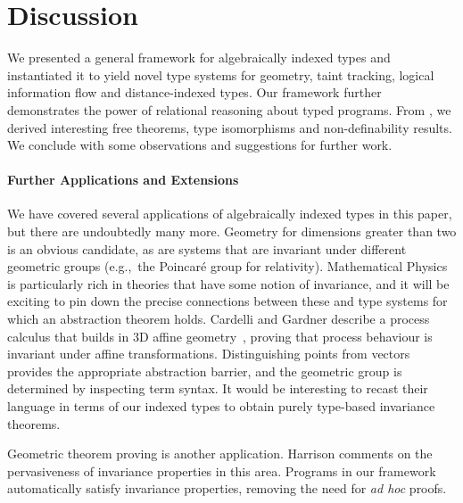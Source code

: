 \section{Discussion}
\label{sec:discussion}

We presented a general framework for algebraically indexed types
and instantiated it to yield novel type systems for geometry, taint
tracking, logical information flow and distance-indexed types. Our
framework further demonstrates the power of relational reasoning about
typed programs. From , we derived
interesting free theorems, type isomorphisms and non-definability
results. We conclude with some observations and suggestions for
further work.

\paragraph{Further Applications and Extensions} We have covered
several applications of algebraically indexed types in this paper, but
there are undoubtedly many more. Geometry for dimensions greater than
two is an obvious candidate, as are systems that are invariant
under different geometric groups (e.g.,~the Poincar\'{e} group for
relativity). Mathematical Physics is particularly rich in theories
that have some notion of invariance, and it will be exciting to pin
down the precise connections between these and type systems for which
an abstraction theorem holds. 
Cardelli and Gardner describe a process calculus that builds in 3D affine geometry~\cite{Cardelli},
proving that process behaviour is invariant under affine transformations. Distinguishing points from vectors
provides the appropriate abstraction barrier, and the geometric group is determined by inspecting
term syntax. It would be interesting to recast their language in terms of our indexed types to
obtain purely type-based invariance theorems.

Geometric theorem
proving is another %
application. Harrison
\cite{harrison09without} comments on the pervasiveness of %
invariance properties in this area. Programs in our framework
automatically satisfy invariance properties, removing the need for
{\em ad hoc} proofs. %


